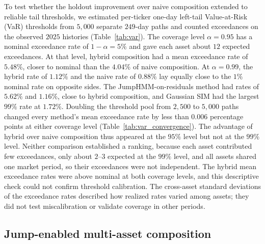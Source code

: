 To test whether the holdout improvement over naive composition
extended to reliable tail thresholds, we estimated per-ticker one-day
left-tail Value-at-Risk (VaR) thresholds from $5{,}000$ separate
$249$-day paths and counted exceedances on the observed $2025$
histories (Table~\ref{tab:var}). The coverage level
$\alpha=0.95$ has a nominal exceedance rate of $1-\alpha=5\%$ and gave
each asset about $12$ expected exceedances. At that level, hybrid
composition had a mean
exceedance rate of $5.48\%$, closer to nominal than the $4.04\%$ of
naive composition. At $\alpha=0.99$, the hybrid rate of $1.12\%$ and
the naive rate of $0.88\%$ lay equally close to the $1\%$ nominal rate
on opposite sides. The JumpHMM-on-residuals method had rates of
$5.62\%$ and $1.16\%$, close to hybrid composition, and Gaussian SIM
had the largest $99\%$ rate at $1.72\%$. Doubling the threshold pool from
$2{,}500$ to $5{,}000$ paths changed every method's mean exceedance
rate by less than $0.006$ percentage points at either coverage level
(Table~\ref{tab:var_convergence}). The advantage of hybrid over
naive composition thus appeared at the $95\%$ level but not at the
$99\%$ level. Neither comparison established a ranking, because each
asset contributed few exceedances, only about $2$--$3$ expected at the
$99\%$ level, and all assets shared one market period, so their
exceedances were not independent. The hybrid mean exceedance rates were above nominal at both
coverage levels, and this descriptive check could not confirm
threshold calibration. The
cross-asset standard deviations of the exceedance rates described how
realized rates varied among assets; they did not test miscalibration
or validate coverage in other periods.




\subsection{Jump-enabled multi-asset composition}
\label{sec:results-jump-composition}

